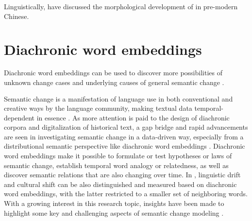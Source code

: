 Linguistically, \textcite{wang2005jia} have discussed the morphological development of \jia in pre-modern Chinese.

\section{Diachronic word embeddings}
Diachronic word embeddings can be used to discover more possibilities of unknown change cases and underlying causes of general semantic change \parencite{hamilton2016cultural,kutuzov2017tracing,heuser2017word}.

Semantic change is a manifestation of language use in both conventional and creative ways by the language community, making textual data temporal-dependent in essence \parencite{kutuzov2018survey}. As more attention is paid to the design of diachronic corpora and digitalization of historical text, a gap bridge and rapid advancements are seen in investigating semantic change in a data-driven way, especially from a distributional semantic perspective like diachronic word embeddings \parencite{kutuzov2018survey, tahmasebi2018survey, hamilton2016law, jawahar2019contextualized}. Diachronic word embeddings make it possible to formulate or test hypotheses or laws of semantic change, establish temporal word analogy or relatedness, as well as discover semantic relations that are also changing over time. In \textcite{hamilton2016cultural}, linguistic drift and cultural shift can be also distinguished and measured based on diachronic word embeddings, with the latter restricted to a smaller set of neighboring words. With a growing interest in this research topic, insights have been made to highlight some key and challenging aspects of semantic change modeling \parencite{kutuzov2018survey,tahmasebi2018survey,camacho2018survey}.


